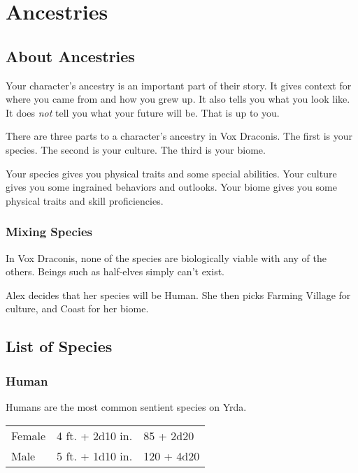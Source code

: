 \chapter{Ancestries}

\begin{multicols}{2}

\section{About Ancestries}

Your character's ancestry is an important part of their story. It gives
context for where you came from and how you grew up. It also tells you
what you look like. It does \textit{not} tell you what your future will
be. That is up to you.

There are three parts to a character's ancestry in Vox Draconis. The first
is your species. The second is your culture. The third is your biome.

Your species gives you physical traits and some special abilities. Your
culture gives you some ingrained behaviors and outlooks. Your biome gives
you some physical traits and skill proficiencies.

\subsection{Mixing Species}

In Vox Draconis, none of the species are biologically viable with any of
the others. Beings such as half-elves simply can't exist.

\begin{displayquote}
Alex decides that her species will be Human. She then picks Farming Village 
for culture, and Coast for her biome.
\end{displayquote}

\section{List of Species}

\subsection{Human}

Humans are the most common sentient species on Yrda.

\begin{center}
{
\begin{xtabular}{|l|l|l|}
Female & 4 ft. + 2d10 in. & 85 + 2d20 \\
Male & 5 ft. + 1d10 in. & 120 + 4d20 \\
\hline
\end{xtabular}
}
\end{center}


\end{multicols}
